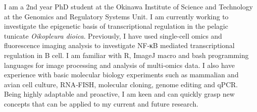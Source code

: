 

\begin{cvparagraph}

I am a 2nd year PhD student at the Okinawa Institute of Science and Technology at the Genomics and Regulatory Systems Unit. I am currently working to investigate the epigenetic basis of transcriptional regulation in the pelagic tunicate \emph{Oikopleura dioica}. Previously, I have used single-cell omics and fluorescence imaging analysis to investigate NF‑κB mediated transcriptional regulation in B cell. I am familiar with R, ImageJ macro and bash programming languages for image processing and analysis of multi‑omics data. I also have experience with basic molecular biology experiments such as mammalian and avian cell culture, RNA‑FISH, molecular cloning, genome editing and qPCR. Being highly adaptable and proactive, I am keen and can quickly grasp new concepts that can be applied to my current and future research.
\end{cvparagraph}
